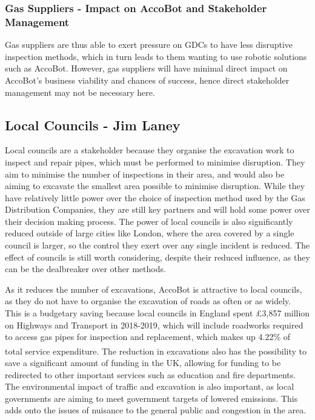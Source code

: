 \documentclass[11pt]{article}		%
\newcommand{\supercite}[1]{\textsuperscript{\cite{#1}}}		%
\begin{document}
		\subsubsection{Gas Suppliers - Impact on AccoBot and Stakeholder Management}
		Gas suppliers are thus able to exert pressure on GDCs to have less disruptive inspection methods, which in turn leads to them wanting to use robotic solutions such as AccoBot. However, gas suppliers will have minimal direct impact on AccoBot’s business viability and chances of success, hence direct stakeholder management may not be necessary here. 
		
		\subsection[Local Councils]{Local Councils - Jim Laney}
			
			Local councils are a stakeholder because they organise the excavation work to inspect and repair pipes, which must be performed to minimise disruption.
			They aim to minimise the number of inspections in their area, and would also be aiming to excavate the smallest area possible to minimise disruption.
			While they have relatively little power over the choice of inspection method used by the Gas Distribution Companies, they are still key partners and will hold some power over their decision making process.
			The power of local councils is also significantly reduced outside of large cities like London, where the area covered by a single council is larger, so the control they exert over any single incident is reduced.
			The effect of councils is still worth considering, despite their reduced influence, as they can be the dealbreaker over other methods.
			
			As it reduces the number of excavations, AccoBot is attractive to local councils, as they do not have to organise the excavation of roads as often or as widely.
			This is a budgetary saving because local councils in England spent £3,857 million on Highways and Transport in 2018-2019, which will include roadworks required to access gas pipes for inspection and replacement, which makes up 4.22\% of total service expenditure\supercite{ministry2020local}.
			The reduction in excavations also has the possibility to save a significant amount of funding in the UK, allowing for funding to be redirected to other important services such as education and fire departments.
			The environmental impact of traffic and excavation is also important, as local governments are aiming to meet government targets of lowered emissions.
			This adds onto the issues of nuisance to the general public and congestion in the area.
		
\end{document}
